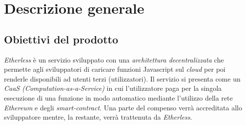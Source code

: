 \section{Descrizione generale}

\subsection{Obiettivi del prodotto}
\textit{Etherless} è un servizio sviluppato con una \textit{architettura decentralizzata\glo} che permette agli sviluppatori di caricare funzioni Javascript sul \textit{cloud\glo} per poi renderle disponibili ad utenti terzi (utilizzatori). Il servizio si presenta come un \textit{CaaS (Computation-as-a-Service)\glos}  in cui l’utilizzatore paga per la singola esecuzione di una funzione in modo automatico mediante l’utilizzo della rete \textit{Ethereum\glo} e degli \textit{smart-contract\glos}. Una parte del compenso verrà accreditata allo sviluppatore mentre, la restante, verrà trattenuta da \textit{Etherless}.

